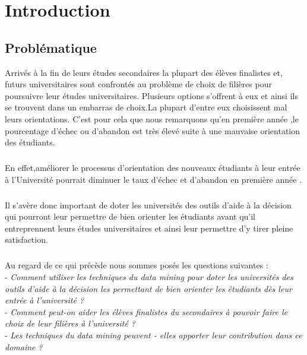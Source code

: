 \chapter*{Introduction}
\section{Problématique}
Arrivés à la fin de leurs études secondaires la plupart des élèves finalistes et, futurs universitaires sont confrontés au problème de choix de filières pour poursuivre leur études universitaires.
Plusieurs options s'offrent à eux et ainsi ils se trouvent dans un embarras de choix.La plupart d'entre eux choisissent mal leurs orientations.
C'est pour cela que nous remarquons qu'en première année ,le pourcentage d'échec ou d'abandon est très élevé suite à une mauvaise orientation des étudiants.\cite{Articl1Mr} 
\paragraph{}
En effet,améliorer le processus d'orientation des nouveaux étudiants à leur entrée à l'Université pourrait diminuer le taux d'échec et d'abandon en première année .
\paragraph{}
Il s'avère donc important de doter les universités des outils d'aide à la décision qui pourront leur permettre de bien orienter les étudiants avant qu'il entreprennent  leurs études universitaires et ainsi leur permettre d'y tirer pleine satisfaction.  
\paragraph{}
Au regard de ce qui précède nous sommes posés les questions suivantes : \\
- \emph{Comment utiliser les techniques  du data mining pour doter les universités des outils d'aide à la décision les permettant de bien orienter les étudiants dès leur entrée à l'université ?  }\\
- \emph{Comment peut-on aider les élèves finalistes du secondaires  à pouvoir faire le choix de leur filières à l'université ? }\\
- \emph{Les techniques du data mining peuvent - elles apporter leur contribution dans ce domaine ? }
